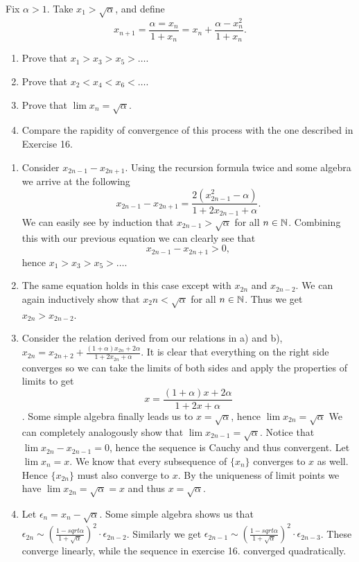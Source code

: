 \begin{problem}
  Fix $\alpha > 1$.
  Take $x_1 > \sqrt{\alpha}$, and define
  \[x_{n + 1} = \frac{\alpha = x_n}{1 + x_n} = x_n + \frac{\alpha - x_n^2}{1 + x_n}.\]
  \begin{enumerate}[label=(\alph*)]
    \item Prove that $x_1 > x_3 > x_5 > \ldots$.
    \item Prove that $x_2 < x_4 < x_6 < \ldots$.
    \item Prove that $\lim x_n = \sqrt{\alpha}$.
    \item Compare the rapidity of convergence of this process with the one described in Exercise 16.
  \end{enumerate}
\end{problem}

\begin{solution}
  \begin{enumerate}[label=(\alph*)]
    \item Consider $x_{2n - 1} - x_{2n + 1}$.
      Using the recursion formula twice and some algebra we arrive at the following
      \[x_{2n - 1} - x_{2n + 1} = \frac{2(x_{2n - 1}^2 - \alpha)}{1 + 2x_{2n - 1} + \alpha}.\]
      We can easily see by induction that $x_{2n - 1} > \sqrt{\alpha}$ for all $n \in \mathbb{N}$.
      Combining this with our previous equation we can clearly see that
      \[x_{2n - 1} - x_{2n + 1} > 0,\]
      hence $x_1 > x_3 > x_5 > \ldots$.
    \item The same equation holds in this case except with $x_{2n}$ and $x_{2n - 2}$.
      We can again inductively show that $x_2n < \sqrt{\alpha}$ for all $n \in \mathbb{N}$.
      Thus we get $x_{2n} > x_{2n - 2}$.
    \item Consider the relation derived from our relations in a) and b), $x_{2n} = x_{2n + 2} + \frac{(1 + \alpha)x_{2n} + 2\alpha}{1 + 2x_{2n} + \alpha}$.
      It is clear that everything on the right side converges so we can take the limits of both sides and apply the properties of limits to get
      \[x = \frac{(1 + \alpha)x + 2\alpha}{1 + 2x + \alpha}\].
      Some simple algebra finally leads us to $x = \sqrt{\alpha}$, hence $\lim x_{2n} = \sqrt{\alpha}$
      We can completely analogously show that $\lim x_{2n - 1} = \sqrt{\alpha}$.
      Notice that $\lim x_{2n} - x_{2n - 1} = 0$, hence the sequence is Cauchy and thus convergent.
      Let $\lim x_n = x$.
      We know that every subsequence of $\{x_n\}$ converges to $x$ as well.
      Hence $\{x_{2n}\}$ must also converge to $x$.
      By the uniqueness of limit points we have $\lim x_{2n} = \sqrt{\alpha} = x$ and thus $x = \sqrt{\alpha}$.
    \item Let $\epsilon_n = x_n - \sqrt{\alpha}$.
      Some simple algebra shows us that $\epsilon_{2n} \sim (\frac{1 - sqrt{\alpha}}{1 + \sqrt{\alpha}})^2 \cdot \epsilon_{2n - 2}$.
      Similarly we get $\epsilon_{2n - 1} \sim (\frac{1 - sqrt{\alpha}}{1 + \sqrt{\alpha}})^2 \cdot \epsilon_{2n - 3}$.
      These converge linearly, while the sequence in exercise 16. converged quadratically.
  \end{enumerate}
\end{solution}

